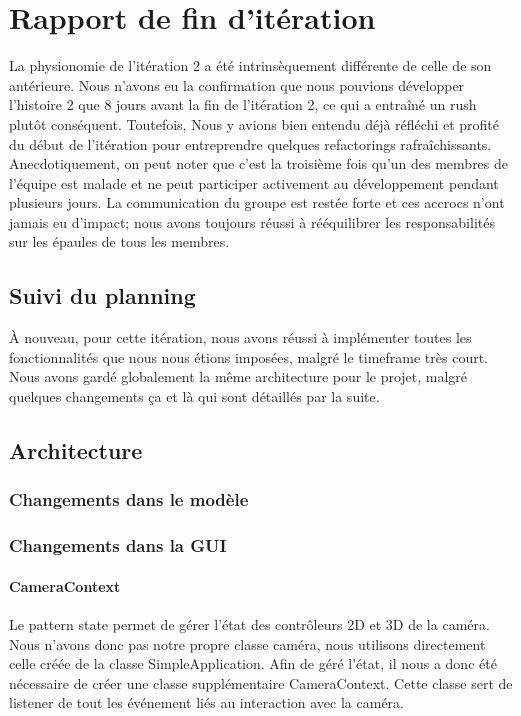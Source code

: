 \section{Rapport de fin d'itération}

La physionomie de l'itération 2 a été intrinsèquement différente de celle de son 
antérieure. Nous n'avons eu la confirmation que nous pouvions développer
l'histoire 2 que 8 jours avant la fin de l'itération 2, ce qui a entraîné un 
rush plutôt conséquent. Toutefois, Nous y avions bien entendu déjà réfléchi et 
profité du début de l'itération pour entreprendre quelques refactorings 
rafraîchissants.\\

Anecdotiquement, on peut noter que c'est la troisième fois qu'un des membres de
l'équipe est malade et ne peut participer activement au développement pendant
plusieurs jours. La communication du groupe est restée forte et ces accrocs 
n'ont jamais eu d'impact; nous avons toujours réussi à rééquilibrer les 
responsabilités sur les épaules de tous les membres.

\subsection{Suivi du planning}
À nouveau, pour cette itération, nous avons réussi à implémenter toutes les 
fonctionnalités que nous nous étions imposées, malgré le timeframe très court.\\

Nous avons gardé globalement la même architecture pour le projet, malgré 
quelques changements ça et là qui sont détaillés par la suite.

\subsection{Architecture}
	
	\subsubsection{Changements dans le modèle}

	\subsubsection{Changements dans la GUI}

		\paragraph{CameraContext}
		Le pattern state permet de gérer l'état des contrôleurs 2D et 3D de la caméra. Nous n'avons donc pas notre propre classe caméra, nous utilisons directement celle créée de la classe SimpleApplication. Afin de géré l'état, il nous a donc été nécessaire de créer une classe supplémentaire CameraContext. Cette classe sert de listener de tout les événement liés au interaction avec la caméra.

